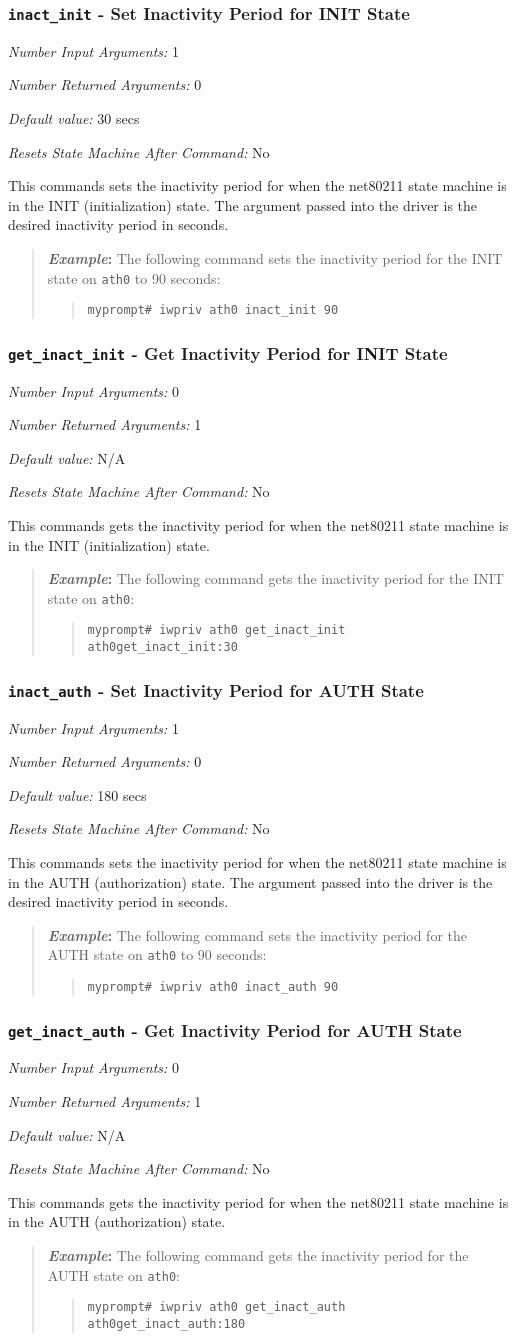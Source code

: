 \documentclass[10pt,fullpage]{article}
\newcommand{\mytt}[1]{{\texttt{#1}}}
\newcommand{\bv}{\begin{verse}}
\newcommand{\ev}{\end{verse}}
\newcommand{\cmd}[1]{{\texttt{myprompt\# #1}}}
\newcommand{\argdesc}[4]{\begin{description}
\itemsep -6pt
\item \textit{Number Input Arguments:} #1
\item \textit{Number Returned Arguments:} #2
\item \textit{Default value:} #3
\item \textit{Resets State Machine After Command:} #4
\end{description}
}
\newenvironment{example}{\begin{quote}\textbf{\textit{Example}:}}{\end{quote}}
\begin{document}
\subsubsection{\mytt{inact\_init} - Set Inactivity Period for INIT
  State}
\argdesc{1}{0}{30 secs}{No}
This commands sets the inactivity period for when the net80211 state
machine is in the INIT (initialization) state.  The argument passed
into the driver is the desired inactivity period in seconds.
\begin{example}
  The following command sets the inactivity period for the INIT state
  on \mytt{ath0} to 90 seconds:
  \bv
  \cmd{iwpriv ath0 inact\_init 90}\\
  \ev
\end{example}

\subsubsection{\mytt{get\_inact\_init} - Get Inactivity Period for INIT
  State}
\argdesc{0}{1}{N/A}{No}
This commands gets the inactivity period for when the net80211 state
machine is in the INIT (initialization) state.
\begin{example}
  The following command gets the inactivity period for the INIT state
  on \mytt{ath0}:
  \bv
  \cmd{iwpriv ath0 get\_inact\_init}\\
  \mytt{ath0\hspace{32pt}get\_inact\_init:30}
  \ev
\end{example}

\subsubsection{\mytt{inact\_auth} - Set Inactivity Period for AUTH
  State}
\argdesc{1}{0}{180 secs}{No}
This commands sets the inactivity period for when the net80211 state
machine is in the AUTH (authorization) state.  The argument passed
into the driver is the desired inactivity period in seconds.
\begin{example}
  The following command sets the inactivity period for the AUTH state
  on \mytt{ath0} to 90 seconds:
  \bv
  \cmd{iwpriv ath0 inact\_auth 90}\\
  \ev
\end{example}

\subsubsection{\mytt{get\_inact\_auth} - Get Inactivity Period for AUTH
  State}
\argdesc{0}{1}{N/A}{No}
This commands gets the inactivity period for when the net80211 state
machine is in the AUTH (authorization) state.
\begin{example}
  The following command gets the inactivity period for the AUTH state
  on \mytt{ath0}:
  \bv
  \cmd{iwpriv ath0 get\_inact\_auth}\\
  \mytt{ath0\hspace{32pt}get\_inact\_auth:180}
  \ev
\end{example}
\end{document}
